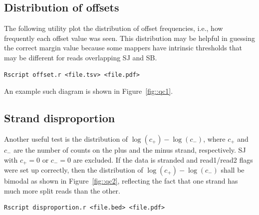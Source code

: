 \documentclass{article}
\begin{document}
\subsection{Distribution of offsets}
The following utility plot the distribution of offset frequencies, i.e., how frequently each offset value was seen. This distribution may be helpful 
in guessing the correct margin value because some mappers have intrinsic thresholds that may be different for reads overlapping SJ and SB.
\begin{verbatim}
Rscript offset.r <file.tsv> <file.pdf>
\end{verbatim}
An example such diagram is shown in Figure~\ref{fig::qc1}.
\begin{figure}
\end{figure}

\subsection{Strand disproportion}
Another useful test is the distribution of $\log(c_+) - \log(c_-)$, where $c_+$ and $c_-$ are the number of counts on the plus and the minus strand, 
respectively. SJ with $c_+=0$ or $c_-=0$ are excluded. If the data is stranded and read1/read2 flags were set up correctly, then the distribution of
$\log(c_+) - \log(c_-)$ shall be bimodal as shown in Figure~\ref{fig::qc2}, reflecting the fact that one strand has much more split reads than 
the other.
\begin{verbatim}
Rscript disproportion.r <file.bed> <file.pdf>
\end{verbatim}
\end{document}
